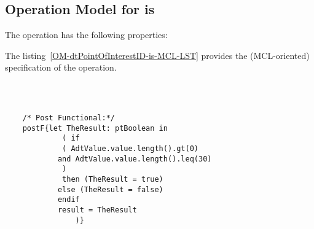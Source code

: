 \subsection{Operation Model for is}

\label{OM-is}


The  operation has the following properties:

	\begin{operationmodel}



		


	\end{operationmodel}



	\vspace{1cm}
	The listing~\ref{OM-dtPointOfInterestID-is-MCL-LST} provides the \msrmessir (MCL-oriented) specification of the operation.
	
	\scriptsize
	\vspace{0.5cm}
	\begin{lstlisting}[style=MessirStyle,firstnumber=auto,captionpos=b,caption={\msrmessir (MCL-oriented) specification of the operation \emph{is}.},label=OM-dtPointOfInterestID-is-MCL-LST]

	
	
	/* Post Functional:*/ 
	postF{let TheResult: ptBoolean in
	   		 ( if
	     	 ( AdtValue.value.length().gt(0)
	        and AdtValue.value.length().leq(30)
	     	 )
	     	 then (TheResult = true)
	      	else (TheResult = false)
	      	endif
	      	result = TheResult
	    		)}
	
	
	\end{lstlisting}
	\normalsize 
	
	
	
	





